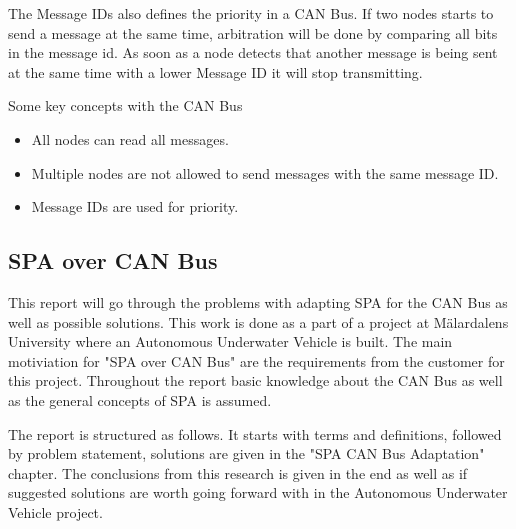 The Message IDs also defines the priority in a CAN Bus. If two nodes starts to
send a message at the same time, arbitration will be done by comparing all bits
in the message id. As soon as a node detects that another message is being sent
at the same time with a lower Message ID it will stop transmitting.

Some key concepts with the CAN Bus
\begin{itemize}
    \item All nodes can read all messages.
    \item Multiple nodes are not allowed to send messages with the same message
        ID.
    \item Message IDs are used for priority.
\end{itemize}




\subsection{SPA over CAN Bus}
This report will go through the problems with adapting SPA for the CAN Bus as
well as possible solutions. This work is done as a part of a project at
M\"{a}lardalens University where an Autonomous Underwater Vehicle is built.
The main motiviation for "SPA over CAN Bus" are the requirements from the
customer for this project. Throughout the report basic knowledge about the CAN
Bus as well as the general concepts of SPA is assumed.

The report is structured as follows. It starts with terms and definitions,
followed by problem statement, solutions are given in the "SPA CAN Bus Adaptation"
chapter. The conclusions from this research is given in the end as well as
if suggested solutions are worth going forward with in the Autonomous
Underwater Vehicle project.
